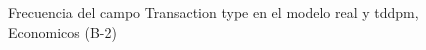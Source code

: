\begin{figure}[H]
    \centering
    
    \caption{Frecuencia del campo Transaction type en el modelo real y tddpm, Economicos (B-2)}
    \label{frecuency-Transaction Type-tddpm_mlp}
\end{figure}
